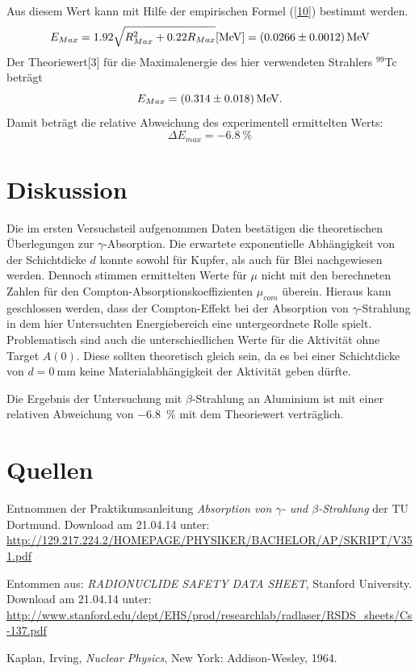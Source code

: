 \documentclass[11pt,ngerman,a4paper]{article}
\begin{document}
Aus diesem Wert kann mit Hilfe der empirischen Formel (\ref{10}) bestimmt werden.
\[
E_{Max} = 1.92\sqrt{R_{Max}^2+0.22R_{Max}}[\si{\mega\eV}] = \SI{0.0266+-0.0012}{\mega\eV}
\]
Der Theoriewert[3] für die Maximalenergie des hier verwendeten Strahlers ${}^{99}$Tc beträgt
\[
E_{Max} = \SI{0.314+-0.018}{\mega\eV}.
\]
Damit beträgt die relative Abweichung des experimentell ermittelten Werts:
\[
\Delta E_{max} = \SI{-6.8}{\percent}
\]
\section{Diskussion}

Die im ersten Versuchsteil aufgenommen Daten bestätigen die theoretischen Überlegungen zur $\gamma$-Absorption. Die erwartete exponentielle Abhängigkeit von der Schichtdicke $d$ konnte sowohl für Kupfer, als auch für Blei nachgewiesen werden. Dennoch stimmen ermittelten Werte für $\mu$ nicht mit den berechneten Zahlen für den Compton-Absorptionskoeffizienten $\mu_{com}$ überein. Hieraus kann geschlossen werden, dass der Compton-Effekt bei der Absorption von $\gamma$-Strahlung in dem hier Untersuchten Energiebereich eine untergeordnete Rolle spielt. Problematisch sind auch die unterschiedlichen Werte für die Aktivität ohne Target $A(0)$. Diese sollten theoretisch gleich sein, da es bei einer Schichtdicke von $d = \SI{0}{\milli\meter}$ keine Materialabhängigkeit der Aktivität geben dürfte.

\noindent
Die Ergebnis der Untersuchung mit $\beta$-Strahlung an Aluminium ist mit einer relativen Abweichung von \SI{-6.8}{\percent} mit dem Theoriewert verträglich.

\noindent
\newpage
\section{Quellen}
\begin{enumerate}[{[}1{]}]
\item Entnommen der Praktikumsanleitung \textit{Absorption von $\gamma$- und $\beta$-Strahlung} der TU Dortmund. Download am 21.04.14 unter:\\
 \url{http://129.217.224.2/HOMEPAGE/PHYSIKER/BACHELOR/AP/SKRIPT/V351.pdf}
 \item Entommen aus: \textit{RADIONUCLIDE SAFETY DATA SHEET}, Stanford University.\\ Download am 21.04.14 unter:\\
\url{http://www.stanford.edu/dept/EHS/prod/researchlab/radlaser/RSDS_sheets/Cs-137.pdf}
 \item Kaplan, Irving, \textit{Nuclear Physics}, New York: Addison-Wesley, 1964.
\end{enumerate}
\end{document}
